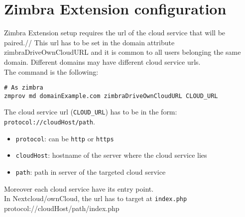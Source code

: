 \section{Zimbra Extension configuration}

    Zimbra Extension setup requires the url of the cloud service that will be paired.//
    This url has to be set in the domain attribute zimbraDriveOwnCloudURL and 
    it is common to all users belonging the same domain.
    Different domains may have different cloud service urls.\\
    The command is the following:
    \begin{verbatim}
# As zimbra
zmprov md domainExample.com zimbraDriveOwnCloudURL CLOUD_URL
    \end{verbatim}

    The cloud service url (\texttt{CLOUD\_URL}) has to be in the form: \texttt{protocol://cloudHost/path}.

    \begin{itemize}
        \item{\texttt{protocol}: can be \texttt{http} or \texttt{https}}
        \item{\texttt{cloudHost}: hostname of the server where the cloud service lies}
        \item{\texttt{path}: path in server of the targeted cloud service}
    \end{itemize}

    Moreover each cloud service have its entry point.\\
    In Nextcloud/ownCloud, the url has to target at \texttt{index.php}\: protocol://cloudHost/path/index.php
